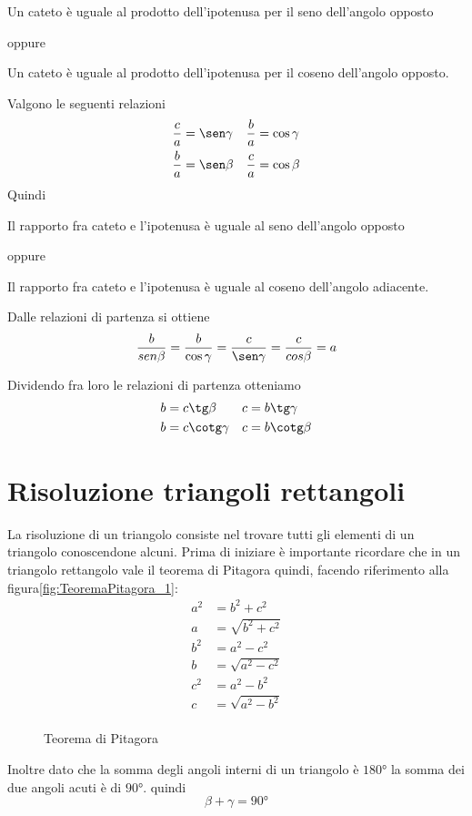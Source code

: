 Un cateto è uguale  al prodotto dell'ipotenusa per il seno dell'angolo opposto

\noindent oppure

Un cateto è uguale al prodotto dell'ipotenusa per il coseno dell'angolo opposto.

\noindent Valgono le seguenti relazioni
\begin{align*}
\dfrac{c}{a}&=\sen\gamma&\dfrac{b}{a}&=\cos\gamma\\
\dfrac{b}{a}&=\sen\beta&\dfrac{c}{a}&=\cos\beta
\end{align*}
Quindi

Il rapporto fra  cateto e l'ipotenusa è uguale al seno dell'angolo opposto

\noindent oppure

Il rapporto fra  cateto e l'ipotenusa è uguale al coseno dell'angolo adiacente.

\noindent Dalle relazioni di partenza si ottiene
\[\dfrac{b}{sen\beta}=\dfrac{b}{\cos\gamma}=\dfrac{c}{\sen\gamma}=\dfrac{c}{cos\beta}=a \]

Dividendo fra loro le relazioni di partenza otteniamo
\begin{align*}
b&=c\tg\beta&c&=b\tg\gamma\\
b&=c\cotg\gamma&c&=b\cotg\beta
\end{align*}
\section{Risoluzione triangoli rettangoli}
La risoluzione di un triangolo consiste nel trovare tutti gli elementi di un triangolo conoscendone alcuni. Prima di iniziare è importante ricordare che in un triangolo rettangolo vale il teorema di Pitagora quindi, facendo riferimento alla figura\nobs\vref{fig:TeoremaPitagora_1}:
\begin{align*}
a^2&=b^2+c^2\\
a{}&=\sqrt{b^2+c^2}\\
b^2&=a^2-c^2\\
b{}&=\sqrt{a^2-c^2}\\
c^2&=a^2-b^2\\
c{}&=\sqrt{a^2-b^2}\\
\end{align*}
\begin{figure}
	\centering
	
	\caption{Teorema di Pitagora}
	\label{fig:TeoremaPitagora_1}
\end{figure}
Inoltre dato che la somma degli angoli interni di un triangolo è 
$\ang{180}$ la somma dei due angoli acuti è di $\ang{90}$. quindi
\[\beta+\gamma=\ang{90}\]
